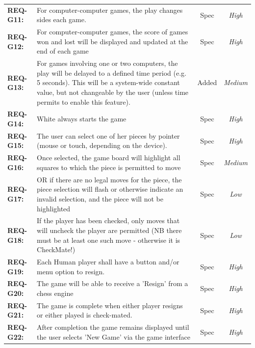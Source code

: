 \documentclass[a4paper,10pt]{article}
\begin{document}
\begin{table}[H]
\begin{tabular}{|| l | p{10.5cm}  |  c  | c ||}
\textbf{REQ-G11:} 
& For computer-computer games, the play changes sides each game.
& Spec  &  \textit{High}\\

\textbf{REQ-G12:} 
& For computer-computer games, the score of games won and lost will be displayed and updated at the end of each game
& Spec  &  \textit{High}\\

\textbf{REQ-G13:} 
& For games involving one or two computers, the play will be delayed to a defined time period (e.g. 5 seconds). This will be a system-wide constant value, but not changeable by the user (unless time permits to enable this feature). 
& Added  &  \textit{Medium}\\

\textbf{REQ-G14:} 
&  White always starts the game
& Spec  &  \textit{High}\\

\textbf{REQ-G15:} 
& The user can select one of her pieces by pointer (mouse or touch, depending on the device). 
& Spec  &  \textit{High}\\

\textbf{REQ-G16:} 
& Once selected, the game board will highlight all squares to which the piece is permitted to move
& Spec  &  \textit{Medium}\\

\textbf{REQ-G17:} 
& OR if there are no legal moves for the piece, the piece selection will flash or otherwise indicate an invalid selection, and the piece will not be highlighted
& Spec  &  \textit{Low}\\

\textbf{REQ-G18:} 
&  If the player has been checked, only moves that will uncheck the player are permitted (NB there must be at least one such move - otherwise it is CheckMate!)
& Spec  &  \textit{Low}\\

\textbf{REQ-G19:} 
&  Each Human player shall have a button and/or menu option to resign.
& Spec  &  \textit{High}\\

\textbf{REQ-G20:} 
&  The game will be able to receive a 'Resign' from a chess engine
& Spec  &  \textit{High}\\

\textbf{REQ-G21:} 
&  The game is complete when either player resigns or either played is check-mated.
& Spec  &  \textit{High}\\


\textbf{REQ-G22:} 
&  After completion the game remains displayed until the user selects 'New Game' via the game interface
& Spec  &  \textit{High}\\



\end{tabular}
\end{table}
\end{document}
